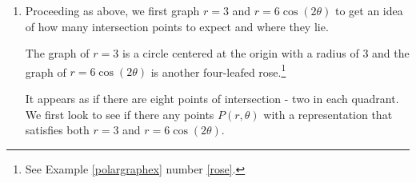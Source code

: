 \documentclass{ximera}
\begin{document}
\begin{example}
\begin{explanation}
\begin{enumerate}
The graph of $r = 3\cos(\theta)$ is also a circle - but this one is centered at the point with rectangular coordinates $\left(\frac{3}{2}, 0\right)$ and has a radius of $\frac{3}{2}$. 

\begin{center}
\end{center}

We have two intersection points to find, one in Quadrant I and one in Quadrant IV.  Proceeding as above, we first determine if any of the intersection points $P$ have a representation $(r,\theta)$ which satisfies both $r=2$ and $r=3\cos(\theta)$. 



Equating $r=2$ and $r=3\cos(\theta)$, we get $2 = 3 \cos(\theta)$, or $\cos(\theta) = \frac{2}{3}$. To solve this equation, we need the arccosine function:   $\theta = \arccos\left(\frac{2}{3}\right) + 2\pi k$ or $\theta = 2\pi - \arccos\left(\frac{2}{3}\right) + 2\pi k$ for integers $k$.  



From these solutions, we get $\left(2, \arccos\left(\frac{2}{3}\right)\right)$ as one representation for our answer in Quadrant I, and  $\left(2, 2\pi - \arccos\left(\frac{2}{3}\right)\right)$ as one representation for our answer in Quadrant IV.  



The reader is encouraged to check these results algebraically and geometrically.

\item  Proceeding as above, we first graph $r = 3$ and $r = 6\cos(2\theta)$  to get an idea of how many intersection points to expect and where they lie.  



The graph of $r=3$ is a circle centered at the origin with a radius of $3$ and the graph of $r = 6\cos(2\theta)$ is another four-leafed rose.\footnote{See Example \ref{polargraphex} number \ref{rose}.}  

\begin{center}
\end{center}

It appears as if there are eight points of intersection - two in each quadrant. We first look to see if there any points $P(r,\theta)$ with a representation that satisfies both $r=3$ and $r = 6\cos(2\theta)$. 




\end{enumerate}
\end{explanation}
\end{example}
\end{document}
